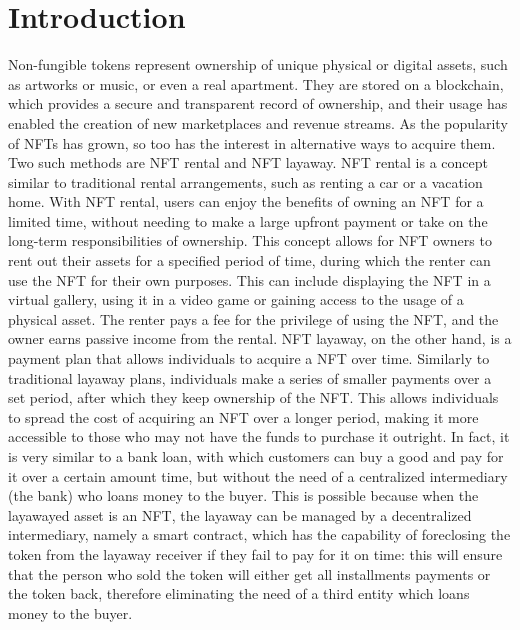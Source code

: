 \documentclass[english, LaM, oneside]{sapthesis}%
\begin{document}
\chapter{Introduction}
\lettrine[lines=2, findent=3pt, nindent=0pt]{N}{}on-fungible tokens represent ownership of unique physical or digital assets, such as artworks or music, or even a real apartment. They are stored on a blockchain, which provides a secure and transparent record of ownership, and their usage has enabled the creation of new marketplaces and revenue streams. As the popularity of NFTs has grown, so too has the interest in alternative ways to acquire them. Two such methods are NFT rental and NFT layaway.
NFT rental is a concept similar to traditional rental arrangements, such as renting a car or a vacation home. With NFT rental, users can enjoy the benefits of owning an NFT for a limited time, without needing to make a large upfront payment or take on the long-term responsibilities of ownership.
This concept allows for NFT owners to rent out their assets for a specified period of time, during which the renter can use the NFT for their own purposes. This can include displaying the NFT in a virtual gallery, using it in a video game or gaining access to the usage of a physical asset. The renter pays a fee for the privilege of using the NFT, and the owner earns passive income from the rental.\newline
NFT layaway, on the other hand, is a payment plan that allows individuals to acquire a NFT over time. Similarly to traditional layaway plans, individuals make a series of smaller payments over a set period, after which they keep ownership of the NFT. This allows individuals to spread the cost of acquiring an NFT over a longer period, making it more accessible to those who may not have the funds to purchase it outright. In fact, it is very similar to a bank loan, with which customers can buy a good and pay for it over a certain amount time, but without the need of a centralized intermediary (the bank) who loans money to the buyer. This is possible because when the layawayed asset is an NFT, the layaway can be managed by a decentralized intermediary, namely a smart contract, which has the capability of foreclosing the token from the layaway receiver if they fail to pay for it on time: this will ensure that the person who sold the token will either get all installments payments or the token back, therefore eliminating the need of a third entity which loans money to the buyer.\newline
\end{document}
